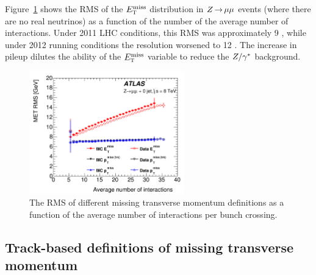 Figure~\ref{fig:METResolution} shows the RMS of the $E_{\textrm{\footnotesize\sc t}}^{\rm miss}$ distribution in $Z\,{\rightarrow}\,\mu\mu$ events (where there are no real neutrinos) as a function of the number of the average number of interactions. Under 2011 LHC conditions, this RMS was approximately 9 \GeV, while under 2012 running conditions the resolution worsened to 12 \GeV. The increase in pileup dilutes the ability of the $E_{\textrm{\footnotesize\sc t}}^{\rm miss}$ variable to reduce the $Z/\gamma^{\ast}$ background. 

\begin{figure}[h!]
  \centering
  \captionsetup{justification=centering}

  \includegraphics[width=0.6\textwidth]{figures/METResolution}
  \caption{The RMS of different missing transverse momentum definitions as a function of the average number of interactions per bunch crossing.}
  \label{fig:METResolution}
\end{figure}

\subsection{Track-based definitions of missing transverse momentum}

